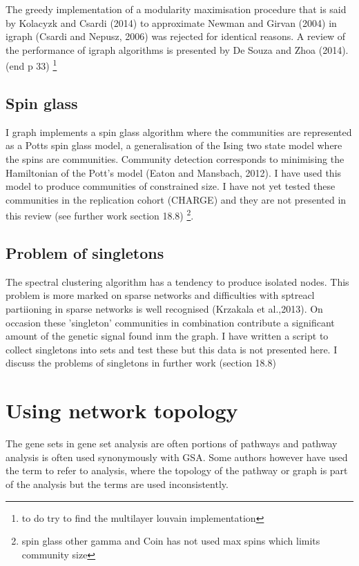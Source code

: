 The greedy implementation of a modularity maximisation procedure that is said by Kolacyzk and Csardi (2014) to approximate Newman and Girvan (2004) in igraph (Csardi and Nepusz, 2006) was rejected for identical reasons. A review of the performance of igraph algorithms is presented by De Souza and Zhoa (2014). (end p 33) \footnote{to do try to find the multilayer louvain implementation}

\subsection{Spin glass}

I graph implements a spin glass algorithm where the communities are represented as a Potts spin glass model, a generalisation of the Ising two state model where the spins are communities. Community detection corresponds to minimising the Hamiltonian of the Pott's model (Eaton and Mansbach, 2012). I have used this model to produce communities of constrained size. I have not yet tested these communities in the replication cohort (CHARGE) and they are not presented in this review (see further work section 18.8) \footnote{spin glass other gamma and Coin has not used max spins which limits community size}.

\subsection{Problem of singletons}

The spectral clustering algorithm has a tendency to produce isolated nodes. This problem is more marked on sparse networks and difficulties with sptreacl partiioning in sparse networks is well recognised (Krzakala et al.,2013). On occasion these 'singleton' communities in combination contribute a significant amount of the genetic signal found inm the graph. I have written a script to collect singletons into sets and test these but this data is not presented here. I discuss the problems of singletons in further work (section 18.8)

\section{Using network topology}

The gene sets in gene set analysis are often portions of pathways and pathway analysis is often used synonymously with GSA. Some authors however have used the term to refer to analysis, where the topology of the pathway or graph is part of the analysis but the terms are used inconsistently.

